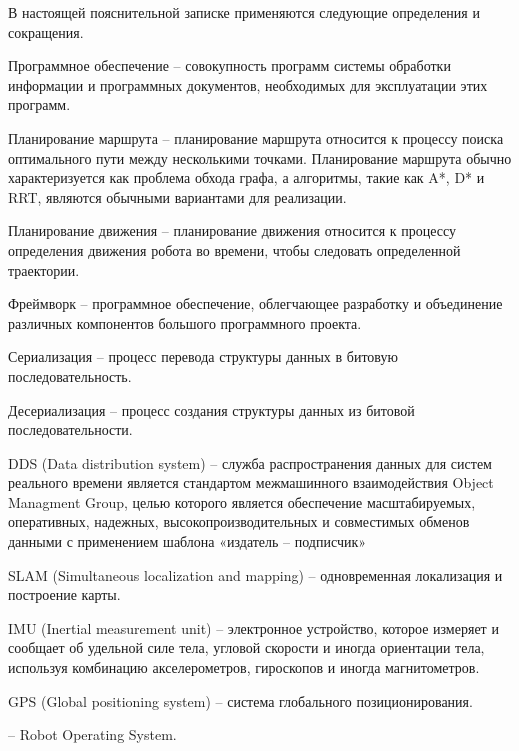 В настоящей пояснительной записке применяются следующие определения и
сокращения.

Программное обеспечение -- совокупность программ системы обработки
информации и программных документов, необходимых для эксплуатации этих
программ.

Планирование маршрута -- планирование маршрута относится к процессу
поиска оптимального пути между несколькими точками. Планирование маршрута обычно
характеризуется как проблема обхода графа, а алгоритмы, такие как A*, D* и RRT,
являются обычными вариантами для реализации.

Планирование движения -- планирование движения относится к процессу
определения движения робота во времени, чтобы следовать определенной
траектории.

Фреймворк -- программное обеспечение, облегчающее разработку и
объединение различных компонентов большого программного проекта.

Сериализация -- процесс перевода структуры данных в битовую последовательность.

Десериализация -- процесс создания структуры данных из битовой последовательности.

DDS (Data distribution system) -- служба распространения данных для систем
реального времени является стандартом межмашинного взаимодействия Object
Managment Group, целью которого является обеспечение масштабируемых,
оперативных, надежных, высокопроизводительных и совместимых обменов данными с
применением шаблона «издатель -- подписчик»

SLAM (Simultaneous localization and mapping) -- одновременная локализация и
построение карты.

IMU (Inertial measurement unit) -- электронное устройство, которое измеряет и
сообщает об удельной силе тела, угловой скорости и иногда ориентации тела,
используя комбинацию акселерометров, гироскопов и иногда магнитометров. 

GPS (Global positioning system) -- система глобального позиционирования.

\ros{} -- Robot Operating System.
